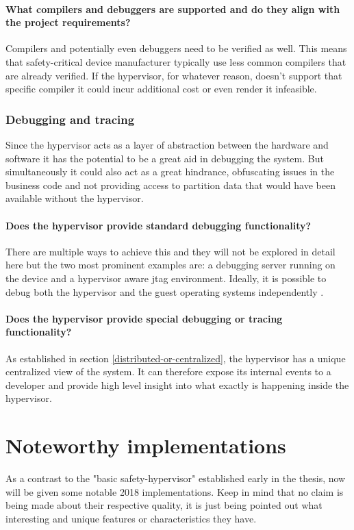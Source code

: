 \paragraph{What compilers and debuggers are supported and do they align with the project requirements?}
Compilers and potentially even debuggers need to be verified as well. This means that safety-critical device manufacturer typically use less common compilers that are already verified. If the hypervisor, for whatever reason, doesn't support that specific compiler it could incur additional cost or even render it infeasible.
\subsubsection{Debugging and tracing}
Since the hypervisor acts as a layer of abstraction between the hardware and software it has the potential to be a great aid in debugging the system. But simultaneously it could also act as a great hindrance, obfuscating issues in the business code and not providing access to partition data that would have been available without the hypervisor.
\paragraph{Does the hypervisor provide standard debugging functionality?}
There are multiple ways to achieve this and they will not be explored in detail here but the two most prominent examples are: a debugging server running on the device and a hypervisor aware \acrshort{jtag} environment. Ideally, it is possible to debug both the hypervisor and the guest operating systems independently \cite{Lauterbach.2018}. 
\paragraph{Does the hypervisor provide special debugging or tracing functionality?}
As established in section \ref{distributed-or-centralized}, the hypervisor has a unique centralized view of the system. It can therefore expose its internal events to a developer and provide high level insight into what exactly is happening inside the hypervisor.


\section{Noteworthy implementations} \label{noteworthy-implementations}
As a contrast to the "basic safety-hypervisor" established early in the thesis, now will be given some notable 2018 implementations. Keep in mind that no claim is being made about their respective quality, it is just being pointed out what interesting and unique features or characteristics they have.
